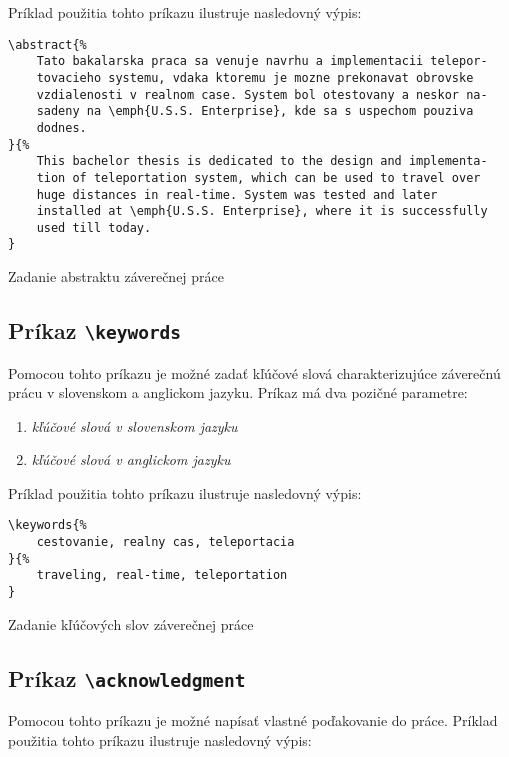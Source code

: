 Príklad použitia tohto príkazu ilustruje nasledovný výpis:

\begin{listing}[ht!]
\begin{verbatim}
\abstract{%
    Tato bakalarska praca sa venuje navrhu a implementacii telepor-
    tovacieho systemu, vdaka ktoremu je mozne prekonavat obrovske 
    vzdialenosti v realnom case. System bol otestovany a neskor na-
    sadeny na \emph{U.S.S. Enterprise}, kde sa s uspechom pouziva 
    dodnes.
}{%
    This bachelor thesis is dedicated to the design and implementa-
    tion of teleportation system, which can be used to travel over
    huge distances in real-time. System was tested and later 
    installed at \emph{U.S.S. Enterprise}, where it is successfully
    used till today.
}
\end{verbatim}
\caption{Zadanie abstraktu záverečnej práce}
\end{listing}


\subsection{Príkaz {\tt \textbackslash{}keywords}}

Pomocou tohto príkazu je možné zadať kľúčové slová charakterizujúce záverečnú prácu v slovenskom a anglickom jazyku. Príkaz má dva pozičné parametre:

\begin{enumerate}
    \item {\it kľúčové slová v slovenskom jazyku}
    \item {\it kľúčové slová v anglickom jazyku}
\end{enumerate}

Príklad použitia tohto príkazu ilustruje nasledovný výpis:

\begin{listing}[ht!]
\begin{verbatim}
\keywords{%
    cestovanie, realny cas, teleportacia
}{%
    traveling, real-time, teleportation
}
\end{verbatim}
\caption{Zadanie kľúčových slov záverečnej práce}
\end{listing}


\subsection{Príkaz {\tt \textbackslash{}acknowledgment}}

Pomocou tohto príkazu je možné napísať vlastné poďakovanie do práce. Príklad použitia tohto príkazu ilustruje nasledovný výpis:

